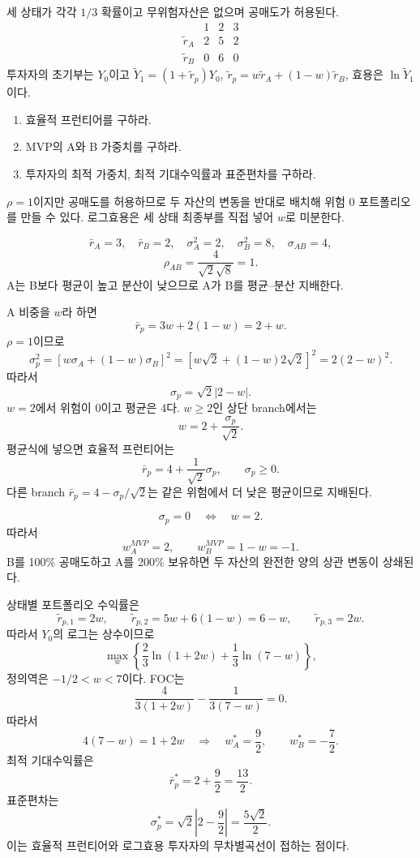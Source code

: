 \begin{officialbox}
세 상태가 각각 $1/3$ 확률이고 무위험자산은 없으며 공매도가 허용된다.
\[
\begin{array}{c|ccc}
&1&2&3\\\hline
\widetilde r_A&2&5&2\\
\widetilde r_B&0&6&0
\end{array}
\]
투자자의 초기부는 $Y_0$이고 $\widetilde Y_1=(1+\widetilde r_p)Y_0$, $\widetilde r_p=w\widetilde r_A+(1-w)\widetilde r_B$, 효용은 $\ln\widetilde Y_1$이다.
\begin{enumerate}[label=(\alph*)]
\item 효율적 프런티어를 구하라.
\item MVP의 A와 B 가중치를 구하라.
\item 투자자의 최적 가중치, 최적 기대수익률과 표준편차를 구하라.
\end{enumerate}
\end{officialbox}

\begin{strategybox}
$\rho=1$이지만 공매도를 허용하므로 두 자산의 변동을 반대로 배치해 위험 0 포트폴리오를 만들 수 있다. 로그효용은 세 상태 최종부를 직접 넣어 $w$로 미분한다.
\end{strategybox}

\begin{solutionbox}
\[
\bar r_A=3,\quad\bar r_B=2,
\quad\sigma_A^2=2,\quad\sigma_B^2=8,
\quad\sigma_{AB}=4,
\]
\[
\rho_{AB}=\frac4{\sqrt2\sqrt8}=1.
\]
A는 B보다 평균이 높고 분산이 낮으므로 A가 B를 평균--분산 지배한다.

A 비중을 $w$라 하면
\[
\bar r_p=3w+2(1-w)=2+w.
\]
$\rho=1$이므로
\[
\sigma_p^2=[w\sigma_A+(1-w)\sigma_B]^2
=[w\sqrt2+(1-w)2\sqrt2]^2
=2(2-w)^2.
\]
따라서
\[
\sigma_p=\sqrt2|2-w|.
\]
$w=2$에서 위험이 0이고 평균은 4다. $w\ge2$인 상단 branch에서는
\[
w=2+\frac{\sigma_p}{\sqrt2}.
\]
평균식에 넣으면 효율적 프런티어는
\[
\boxed{\bar r_p=4+\frac1{\sqrt2}\sigma_p,\qquad\sigma_p\ge0}.
\]
다른 branch $\bar r_p=4-\sigma_p/\sqrt2$는 같은 위험에서 더 낮은 평균이므로 지배된다.

\[
\sigma_p=0\quad\Longleftrightarrow\quad w=2.
\]
따라서
\[
\boxed{w_A^{MVP}=2,\qquad w_B^{MVP}=1-w=-1}.
\]
B를 100\% 공매도하고 A를 200\% 보유하면 두 자산의 완전한 양의 상관 변동이 상쇄된다.

상태별 포트폴리오 수익률은
\[
\widetilde r_{p,1}=2w,\qquad
\widetilde r_{p,2}=5w+6(1-w)=6-w,\qquad
\widetilde r_{p,3}=2w.
\]
따라서 $Y_0$의 로그는 상수이므로
\[
\max_w\left\{\frac23\ln(1+2w)+\frac13\ln(7-w)\right\},
\]
정의역은 $-1/2<w<7$이다. FOC는
\[
\frac{4}{3(1+2w)}-\frac1{3(7-w)}=0.
\]
따라서
\[
4(7-w)=1+2w
\quad\Longrightarrow\quad
\boxed{w_A^*=\frac92,\qquad w_B^*=-\frac72}.
\]
최적 기대수익률은
\[
\bar r_p^*=2+\frac92=\frac{13}{2}.
\]
표준편차는
\[
\sigma_p^*=\sqrt2\left|2-\frac92\right|
=\boxed{\frac{5\sqrt2}{2}}.
\]
이는 효율적 프런티어와 로그효용 투자자의 무차별곡선이 접하는 점이다.
\end{solutionbox}

